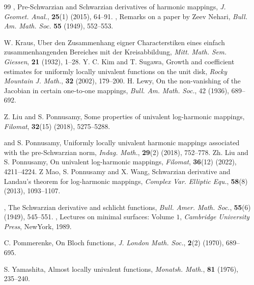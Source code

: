 \documentclass[12pt,reqno]{amsart}
\newtheorem{open problem}{Open problem}[section]
\numberwithin{equation}{section}
\begin{document}
\begin{thebibliography}{99}
,  Pre-Schwarzian and Schwarzian derivatives of harmonic mappings, {\it J. Geomet. Anal.}, {\bf 25}(1)  (2015), 64--91.
, Remarks on a paper by Zeev Nehari, {\it Bull. Am. Math. Soc.} {\bf55} (1949), 552--553.

{\sc W. Kraus}, Uber den Zusammenhang eigner Characterstiken eines einfach zusammenhangenden Bereiches mit der Kreisabbildung, {\it Mitt. Math. Sem. Giessen}, {\bf 21}  (1932),  1--28.
 {\sc Y. C. Kim} and {\sc T. Sugawa}, Growth and coefficient estimates for uniformly locally univalent functions on the unit disk, {\it Rocky Mountain J. Math.}, {\bf 32}  (2002), 179--200.
 {\sc H. Lewy}, On the non-vanishing of the Jacobian in certain one-to-one mappings, {\it Bull. Am. Math. Soc.}, 42 (1936), 689--692.

{\sc Z. Liu} and {\sc S. Ponnusamy}, Some properties of univalent log-harmonic mappings, {\it Filomat}, {\bf 32}(15) (2018), 5275--5288.

 and {\sc S. Ponnusamy}, Uniformly locally univalent harmonic mappings associated with the pre-Schwarzian norm, {\it 	Indag. Math.}, {\bf 29}(2) (2018), 752--778.
{\sc Zh. Liu} and {\sc S. Ponnusamy}, On univalent log-harmonic mappings, {\it Filomat}, {\bf 36}(12) (2022), 4211--4224.
{\sc Z Mao, S. Ponnusamy} and {\sc X. Wang}, Schwarzian derivative and Landau's theorem for log-harmonic mappings, {\it Complex Var. Elliptic Equ.}, {\bf 58}(8) (2013), 1093--1107.

, The Schwarzian derivative and schlicht functions, {\it Bull. Amer. Math. Soc.}, {\bf 55}(6) (1949), 545--551.
, Lectures on minimal surfaces: Volume $1$, {\it Cambridge University Press}, NewYork, 1989.

{\sc C. Pommerenke}, On Bloch functions, {\it J. London Math. Soc.}, {\bf 2}(2) (1970), 689--695.

{\sc S. Yamashita}, Almost locally univalent functions, \textit{Monatsh. Math.}, {\bf 81} (1976), 235--240.

\end{thebibliography}
\end{document}
